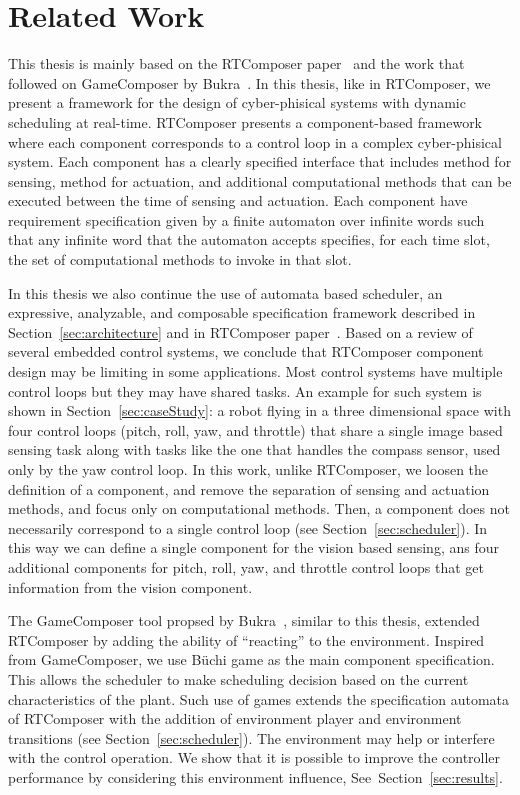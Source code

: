 \documentclass[ twoside, 12pt ]{article}
\newcommand{\buchi}{B\"uchi }
\begin{document}
\section{Related Work}

This thesis is mainly based on the RTComposer paper~\cite{RTComposer} and the work that followed on GameComposer by Bukra~\cite{Merav}.
In this thesis, like in RTComposer, we present a framework for the design of cyber-phisical systems with dynamic scheduling at real-time.
RTComposer presents a component-based framework where each component corresponds to a control loop in a complex cyber-phisical system.
Each component has a clearly specified interface that includes method for sensing, method for actuation, and additional computational methods that can be executed between the time of sensing and actuation. Each component have requirement specification given by a finite automaton over infinite words such that any infinite word that the automaton accepts specifies, for each time slot, the set of computational methods to invoke in that slot.

In this thesis we also continue the use of automata based scheduler, an expressive, analyzable, and composable specification framework described in Section~\ref{sec:architecture} and in RTComposer paper~\cite{RTComposer}. Based on a review of several embedded control systems, we conclude that RTComposer component design may be limiting in some applications. 
Most control systems have multiple control loops but they may have shared tasks. An example for such system is shown in Section~\ref{sec:caseStudy}: a robot flying in a three dimensional space with four control loops (pitch, roll, yaw, and throttle) that share a single image based sensing task along with tasks like the one that handles the compass sensor, used only by the yaw control loop.
In this work, unlike RTComposer, we loosen the definition of a component, and remove the separation of sensing and actuation methods, and focus only on computational methods. Then, a component does not necessarily correspond to a single control loop (see Section~\ref{sec:scheduler}). In this way we can define a single component for the vision based sensing, ans four additional components for pitch, roll, yaw, and throttle control loops that get information from the vision component.

The GameComposer tool propsed by Bukra~\cite{Merav}, similar to this thesis, extended RTComposer by adding the ability of ``reacting'' to the environment.
Inspired from GameComposer, we use \buchi game as the main component specification. This allows the scheduler to make scheduling decision based on the current characteristics of the plant.
Such use of games extends the specification automata of RTComposer with the addition of environment player and environment transitions (see Section~\ref{sec:scheduler}).
The environment may help or interfere with the control operation. We show that it is possible to improve the controller performance by considering this environment influence, See~Section~\ref{sec:results}. 
\end{document}

